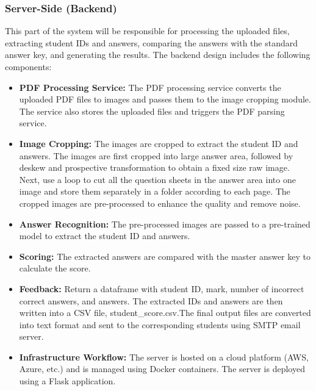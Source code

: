 \documentclass[twocolumn]{article}
\begin{document}
        \subsubsection{Server-Side (Backend)}
        This part of the system will be responsible for processing the uploaded files, extracting student IDs and answers, comparing the answers with the standard answer key, and generating the results. The backend design includes the following components:
        \begin{itemize}
            \item \textbf{PDF Processing Service:} The PDF processing service converts the uploaded PDF files to images and passes them to the image cropping module. The service also stores the uploaded files and triggers the PDF parsing service.
            \item \textbf{Image Cropping:} The images are cropped to extract the student ID and answers. The images are first cropped into large answer area, followed by deskew and prospective transformation to obtain a fixed size raw image. Next, use a loop to cut all the question sheets in the answer area into one image and store them separately in a folder according to each page. The cropped images are pre-processed to enhance the quality and remove noise. 
            \item \textbf{Answer Recognition:} The pre-processed images are passed to a pre-trained model to extract the student ID and answers.
            \item \textbf{Scoring:} The extracted answers are compared with the master answer key to calculate the score.
            \item \textbf{Feedback:} Return a dataframe with student ID, mark, number of incorrect correct answers, and answers. The extracted IDs and answers are then written into a CSV file, student\_score.csv.The final output files are converted into text format and sent to the corresponding students using SMTP email server.
            \item \textbf{Infrastructure Workflow:} The server is hosted on a cloud platform (AWS, Azure, etc.) and is managed using Docker containers. The server is deployed using a Flask application.
        \end{itemize}
\end{document}
